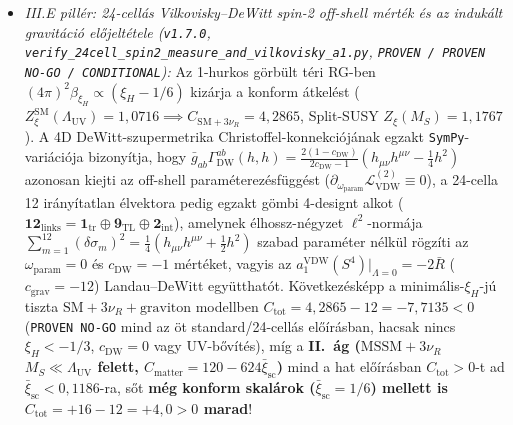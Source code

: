 \documentclass[11pt,a4paper]{article}
\begin{document}
\begin{enumerate}
\begin{itemize}
        \item \emph{III.E pillér: 24-cellás Vilkovisky--DeWitt spin-2 off-shell mérték és az indukált gravitáció előjeltétele (\texttt{v1.7.0}, \texttt{verify\_\allowbreak 24cell\_\allowbreak spin2\_\allowbreak measure\_\allowbreak and\_\allowbreak vilkovisky\_\allowbreak a1.py}, \texttt{PROVEN / PROVEN NO-GO / CONDITIONAL}):} Az 1-hurkos görbült téri RG-ben $(4\pi)^2\beta_{\xi_H}\propto(\xi_H-1/6)$ kizárja a konform átkelést ($Z_\xi^{\mathrm{SM}}(\Lambda_{\mathrm{UV}})=1{,}0716\implies C_{\mathrm{SM}+3\nu_R}=4{,}2865$, Split-SUSY $Z_\xi(M_S)=1{,}1767$). A 4D DeWitt-szupermetrika Christoffel-konnekciójának egzakt \texttt{SymPy}-variációja \cite{Vilkovisky1984,ChristensenDuff1980} bizonyítja, hogy $\bar g_{ab}\Gamma_{\mathrm{DW}}^{ab}(h,h)=\frac{2(1-c_{\mathrm{DW}})}{2c_{\mathrm{DW}}-1}(h_{\mu\nu}h^{\mu\nu}-\frac{1}{4}h^2)$ azonosan kiejti az off-shell paraméterezésfüggést ($\partial_{\omega_{\mathrm{param}}}\mathcal{L}_{\mathrm{VDW}}^{(2)}\equiv 0$), a 24-cella 12 irányítatlan élvektora pedig egzakt gömbi 4-designt alkot ($\mathbf{12}_{\mathrm{links}}=\mathbf{1}_{\mathrm{tr}}\oplus\mathbf{9}_{\mathrm{TL}}\oplus\mathbf{2}_{\mathrm{int}}$), amelynek élhossz-négyzet $\ell^2$-normája $\sum_{m=1}^{12}(\delta\sigma_m)^2=\frac{1}{4}(h_{\mu\nu}h^{\mu\nu}+\frac{1}{2}h^2)$ szabad paraméter nélkül rögzíti az $\omega_{\mathrm{param}}=0$ és $c_{\mathrm{DW}}=-1$ mértéket, vagyis az $a_1^{\mathrm{VDW}}(S^4)|_{\Lambda=0}=-2\bar R$ ($c_{\mathrm{grav}}=-12$) Landau--DeWitt együtthatót. Következésképp a minimális-$\xi_H$-jú tiszta $\mathrm{SM}+3\nu_R+\text{graviton}$ modellben $C_{\mathrm{tot}}=4{,}2865-12=-7{,}7135<0$ (\texttt{PROVEN NO-GO} mind az öt standard/24-cellás előírásban, hacsak nincs $\xi_H<-1/3$, $c_{\mathrm{DW}}=0$ vagy UV-bővítés), míg a \textbf{II.~ág ($\mathrm{MSSM}+3\nu_R$ $M_S\ll\Lambda_{\mathrm{UV}}$ felett, $C_{\mathrm{matter}}=120-624\bar\xi_{\mathrm{sc}}$)} mind a hat előírásban $C_{\mathrm{tot}}>0$-t ad $\bar\xi_{\mathrm{sc}}<0{,}1186$-ra, sőt \textbf{még konform skalárok ($\bar\xi_{\mathrm{sc}}=1/6$) mellett is $C_{\mathrm{tot}}=+16-12=+4{,}0>0$ marad}!
    \end{itemize}
\end{enumerate}
\end{document}
